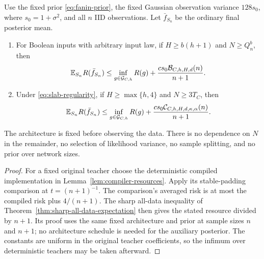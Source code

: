 \begin{theorem}
\label{thm:compiled-expectation}
Use the fixed prior \eqref{eq:fanin-prior}, the fixed Gaussian observation variance $128s_0$, where $s_0=1+\sigma^2$, and all $n$ IID observations. Let $\bar f_{S_n}$ be the ordinary final posterior mean.
\begin{enumerate}
\item For Boolean inputs with arbitrary input law, if $H\ge b(h+1)$ and $N\ge Q_n^b$, then
\[
 \mathbb E_{S_n}R(\bar f_{S_n})
 \le\inf_{g\in\mathcal G_{C,h}}R(g)
    +\frac{c s_0\mathcal B_{C,h,H,d}(n)}{n+1}.
\]
\item Under \eqref{eq:slab-regularity}, if $H\ge\max\{h,4\}$ and $N\ge3T_C$, then
\[
 \mathbb E_{S_n}R(\bar f_{S_n})
 \le\inf_{g\in\mathcal G_{C,h}}R(g)
    +\frac{c s_0\mathcal C_{C,h,H,d,\kappa,\alpha}(n)}{n+1}.
\]
\end{enumerate}
The architecture is fixed before observing the data. There is no dependence on $N$ in the remainder, no selection of likelihood variance, no sample splitting, and no prior over network sizes.
\end{theorem}
\begin{proof}
For a fixed original teacher choose the deterministic compiled implementation in Lemma~\ref{lem:compiler-resources}. Apply its stable-padding comparison at $t=(n+1)^{-1}$. The comparison's averaged risk is at most the compiled risk plus $4/(n+1)$. The sharp all-data inequality of Theorem~\ref{thm:sharp-all-data-expectation} then gives the stated resource divided by $n+1$. Its proof uses the same fixed architecture and prior at sample sizes $n$ and $n+1$; no architecture schedule is needed for the auxiliary posterior. The constants are uniform in the original teacher coefficients, so the infimum over deterministic teachers may be taken afterward.
\end{proof}

